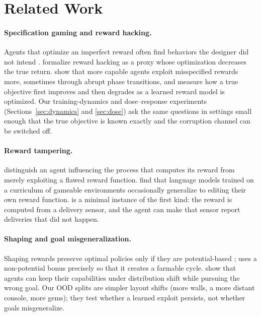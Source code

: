 \section{Related Work}
\label{sec:related}

\paragraph{Specification gaming and reward hacking.}
Agents that optimize an imperfect reward often find behaviors the designer did
not intend \citep{amodei2016concrete,krakovna2020specification}.
\citet{skalse2022rewardhacking} formalize reward hacking as a proxy whose
optimization decreases the true return. \citet{pan2022effects} show that more
capable agents exploit misspecified rewards more, sometimes through abrupt phase
transitions, and \citet{gao2023scaling} measure how a true objective first
improves and then degrades as a learned reward model is optimized. Our
training-dynamics and dose--response experiments (Sections~\ref{sec:dynamics}
and \ref{sec:dose}) ask the same questions in settings small enough that the
true objective is known exactly and the corruption channel can be switched off.

\paragraph{Reward tampering.}
\citet{everitt2021reward} distinguish an agent influencing the process that
computes its reward from merely exploiting a flawed reward function.
\citet{denison2024sycophancy} find that language models trained on a curriculum
of gameable environments occasionally generalize to editing their own reward
function. \ST{} is a minimal instance of the first kind: the reward is computed
from a delivery sensor, and the agent can make that sensor report deliveries
that did not happen.

\paragraph{Shaping and goal misgeneralization.}
Shaping rewards preserve optimal policies only if they are potential-based
\citep{ng1999policy}; \PF{} uses a non-potential bonus precisely so that it
creates a farmable cycle. \citet{langosco2022goal} show that agents can keep
their capabilities under distribution shift while pursuing the wrong goal. Our
OOD splits are simpler layout shifts (more walls, a more distant console, more
gems); they test whether a learned exploit persists, not whether goals
misgeneralize.

